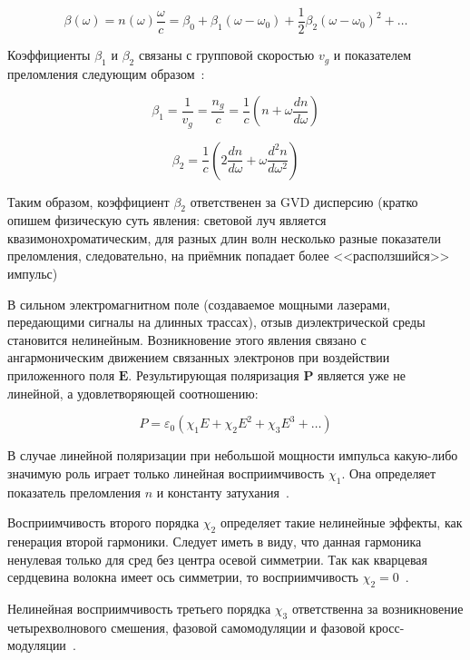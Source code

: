 \begin{equation}
	\beta(\omega) = n(\omega) \frac{\omega}{c} = \beta_0 + \beta_1 (\omega - \omega_0) + \frac{1}{2} \beta_2 (\omega - \omega_0)^2 + \ldots
\end{equation}

Коэффициенты $\beta_1$ и $\beta_2$ связаны с групповой скоростью $v_g$ и показателем преломления следующим образом~\cite{agrawal2007nonlinear}:

\begin{equation}
	\beta_1 = \frac{1}{v_g} = \frac{n_g}{c} = \frac{1}{c}\left( n + \omega \frac{dn}{d\omega} \right)
\end{equation}

\begin{equation}
	\beta_2 = \frac{1}{c}\left(2 \frac{dn}{d\omega} + \omega \frac{d^2n}{d\omega^2} \right)
\end{equation}

Таким образом, коэффициент $\beta_2$ ответственен за GVD дисперсию (кратко опишем физическую суть явления: световой луч является квазимонохроматическим, для разных длин волн несколько разные показатели преломления, следовательно, на приёмник попадает более <<расползшийся>> импульс)

В сильном электромагнитном поле (создаваемое мощными лазерами, передающими сигналы на длинных трассах), отзыв диэлектрической среды становится нелинейным.
Возникновение этого явления связано с ангармоническим движением связанных электронов при воздействии приложенного поля $\mathbf{E}$.
Результирующая поляризация $\mathbf{P}$ является уже не линейной, а удовлетворяющей соотношению:

\begin{equation}
	P = \varepsilon_0 \left( \chi_1 E + \chi_2 E^2 + \chi_3 E^3 + \ldots \right)
\end{equation}

В случае линейной поляризации при небольшой мощности импульса какую-либо значимую роль играет только линейная восприимчивость $\chi_1$.
Она определяет показатель преломления $n$ и константу затухания~\cite{agrawal2007nonlinear}.

Восприимчивость второго порядка $\chi_2$ определяет такие нелинейные эффекты, как генерация второй гармоники.
Следует иметь в виду, что данная гармоника ненулевая только для сред без центра осевой симметрии.
Так как кварцевая сердцевина волокна имеет ось симметрии, то восприимчивость $\chi_2 = 0$~\cite{buck2004fundamentals}.

Нелинейная восприимчивость третьего порядка $\chi_3$ ответственна за возникновение четырехволнового смешения, фазовой самомодуляции и фазовой кросс-модуляции~\cite{Igumenov2023}.

